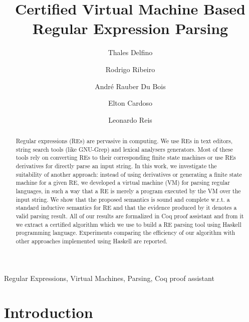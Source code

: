 \documentclass[review]{elsarticle}
\theoremstyle{definition}
\begin{document}
\begin{frontmatter}

\title{Certified Virtual Machine Based Regular Expression Parsing}

\author{Thales Delfino}
\author{Rodrigo Ribeiro}
\address{Programa de P\'os-Gradua\c{c}\~ao em Ci\^encia da Computa\c{c}\~ao -
  PPGCC, Universidade Federal de Ouro Preto}
\author{Andr\'e Rauber Du Bois}
\address{Programa de P\'os-Gradua\c{c}\~ao em Computa\c{c}\~ao -
  PPGC, Universidade Federal de Pelotas}
\author{Elton Cardoso}
\address{Departamento de Computa\c{c}\~ao e Sistemas - DECSI, Universidade Federal de Ouro Preto}
\author{Leonardo Reis}
\address{Departamento de Computa\c{c}\~ao, Universidade Federal de Juiz de Fora}


\begin{abstract}
Regular expressions (REs) are pervasive in computing. We use REs in text editors, string search tools
(like GNU-Grep) and lexical analysers generators. Most of these tools rely on
converting REs to their corresponding finite state machines or use REs derivatives for directly parse an
input string. In this work, we investigate the suitability of another approach: instead of
using derivatives or generating a finite state machine for a given RE, we developed a virtual machine
(VM) for parsing regular languages, in such a way that a RE is merely a program executed by the VM
over the input string. We show that the proposed semantics is sound and complete w.r.t. a standard
inductive semantics for RE and that the evidence produced by it denotes a valid parsing result.
All of our results are formalized in Coq proof assistant and from it we extract a certified algorithm
which we use to build a RE parsing tool using Haskell programming language. Experiments comparing the
efficiency of our algorithm with other approaches implemented using Haskell are reported.
\end{abstract}

\begin{keyword}
Regular Expressions, Virtual Machines, Parsing, Coq proof assistant
\end{keyword}

\end{frontmatter}

\linenumbers

%

\section{Introduction}\label{sec:intro}
\end{document}
